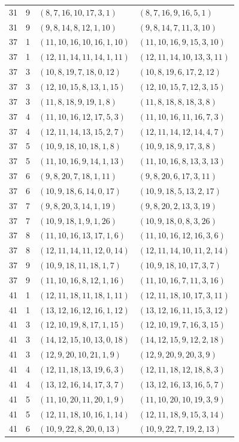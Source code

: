 \documentclass[11pt,a4paper,oneside,openany]{book}
\theoremstyle{definition}
\numberwithin{equation}{chapter}
\begin{document}
\begin{longtable}{rrll}
31&9&$(8,7,16,10,17,3,1)$&$(8,7,16,9,16,5,1)$\\
31&9&$(9,8,14,8,12,1,10)$&$(9,8,14,7,11,3,10)$\\
37&1&$(11,10,16,10,16,1,10)$&$(11,10,16,9,15,3,10)$\\
37&1&$(12,11,14,11,14,1,11)$&$(12,11,14,10,13,3,11)$\\
37&3&$(10,8,19,7,18,0,12)$&$(10,8,19,6,17,2,12)$\\
37&3&$(12,10,15,8,13,1,15)$&$(12,10,15,7,12,3,15)$\\
37&3&$(11,8,18,9,19,1,8)$&$(11,8,18,8,18,3,8)$\\
37&4&$(11,10,16,12,17,5,3)$&$(11,10,16,11,16,7,3)$\\
37&4&$(12,11,14,13,15,2,7)$&$(12,11,14,12,14,4,7)$\\
37&5&$(10,9,18,10,18,1,8)$&$(10,9,18,9,17,3,8)$\\
37&5&$(11,10,16,9,14,1,13)$&$(11,10,16,8,13,3,13)$\\
37&6&$(9,8,20,7,18,1,11)$&$(9,8,20,6,17,3,11)$\\
37&6&$(10,9,18,6,14,0,17)$&$(10,9,18,5,13,2,17)$\\
37&7&$(9,8,20,3,14,1,19)$&$(9,8,20,2,13,3,19)$\\
37&7&$(10,9,18,1,9,1,26)$&$(10,9,18,0,8,3,26)$\\
37&8&$(11,10,16,13,17,1,6)$&$(11,10,16,12,16,3,6)$\\
37&8&$(12,11,14,11,12,0,14)$&$(12,11,14,10,11,2,14)$\\
37&9&$(10,9,18,11,18,1,7)$&$(10,9,18,10,17,3,7)$\\
37&9&$(11,10,16,8,12,1,16)$&$(11,10,16,7,11,3,16)$\\
41&1&$(12,11,18,11,18,1,11)$&$(12,11,18,10,17,3,11)$\\
41&1&$(13,12,16,12,16,1,12)$&$(13,12,16,11,15,3,12)$\\
41&3&$(12,10,19,8,17,1,15)$&$(12,10,19,7,16,3,15)$\\
41&3&$(14,12,15,10,13,0,18)$&$(14,12,15,9,12,2,18)$\\
41&3&$(12,9,20,10,21,1,9)$&$(12,9,20,9,20,3,9)$\\
41&4&$(12,11,18,13,19,6,3)$&$(12,11,18,12,18,8,3)$\\
41&4&$(13,12,16,14,17,3,7)$&$(13,12,16,13,16,5,7)$\\
41&5&$(11,10,20,11,20,1,9)$&$(11,10,20,10,19,3,9)$\\
41&5&$(12,11,18,10,16,1,14)$&$(12,11,18,9,15,3,14)$\\
41&6&$(10,9,22,8,20,0,13)$&$(10,9,22,7,19,2,13)$\\

\end{longtable}
\end{document}
